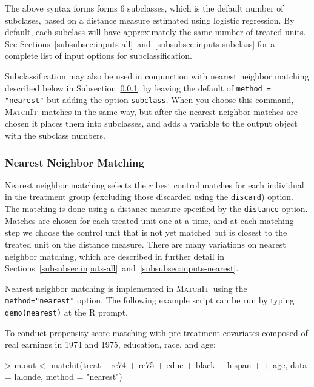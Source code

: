 \documentclass[oneside,letterpaper,titlepage]{article}
\newcommand{\MatchIt}{\textsc{MatchIt}}
\begin{document}
The above syntax forms forms 6 subclasses, which is the default number
of subclases, based on a distance measure estimated using logistic
regression.  By default, each subclass will have approximately the
same number of treated units.  See
Sections~\ref{subsubsec:inputs-all}~and~\ref{subsubsec:inputs-subclass}
for a complete list of input options for subclassification.

Subclassification may also be used in conjunction with nearest
neighbor matching described below in
Subsection~\ref{subsubsec:nearest}, by leaving the default
of \texttt{method = "nearest"} but adding the option
\texttt{subclass}.  When you choose this command, \MatchIt\ matches in
the same way, but after the nearest neighbor matches are chosen it places them into
subclasses, and adds a variable to the output 
object with the subclass numbers.

\subsubsection{Nearest Neighbor Matching}
\label{subsubsec:nearest}

Nearest neighbor matching selects the $r$ best control matches for
each individual in the treatment group (excluding those discarded
using the \texttt{discard}) option.  The matching is done using a
distance measure specified by the {\tt distance} option. Matches are
chosen for each treated unit one at a time, and at each matching step
we choose the control unit that is not yet matched but is closest to
the treated unit on the distance measure.  There are many variations
on nearest neighbor matching, which are described in further detail in
Sections~\ref{subsubsec:inputs-all}~and~\ref{subsubsec:inputs-nearest}.

Nearest neighbor matching is implemented in \MatchIt\ using the
\texttt{method="nearest"} option.  The following example script can be
run by typing {\tt demo(nearest)} at the R prompt.

To conduct propensity score matching with pre-treatment covariates
composed of real earnings in 1974 and 1975, education, race, and age:

\begin{Schunk}
\begin{Sinput}
> m.out <- matchit(treat ~ re74 + re75 + educ + black + hispan + 
+     age, data = lalonde, method = "nearest")
\end{Sinput}
\end{Schunk}
\end{document}
